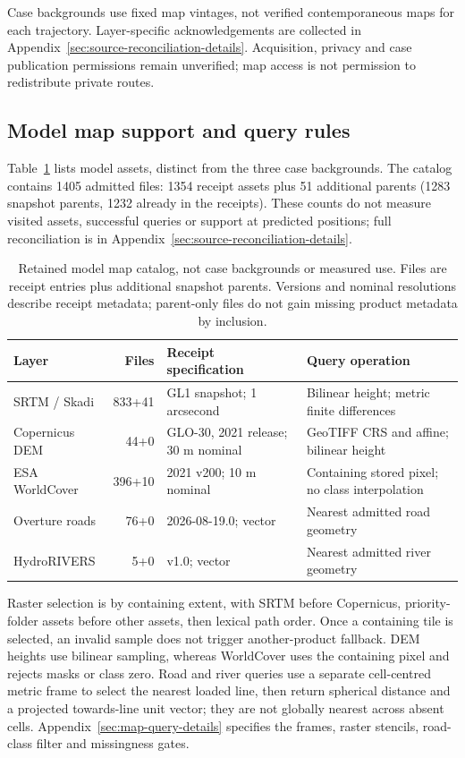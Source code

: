 \documentclass[11pt]{article}
\begin{document}
Case backgrounds use fixed map vintages, not verified contemporaneous
maps for each trajectory. Layer-specific acknowledgements are collected in
Appendix~\ref{sec:source-reconciliation-details}. Acquisition, privacy and
case publication permissions remain unverified; map access is not permission
to redistribute private routes.

\subsection{Model map support and query rules}
\label{sec:model-map-support}
Table~\ref{tab:model-map-catalog} lists model assets, distinct from the three
case backgrounds. The catalog contains 1405 admitted files: 1354 receipt
assets plus 51 additional parents (1283 snapshot parents, 1232 already in the
receipts). These counts do not measure visited assets, successful queries or
support at predicted positions; full reconciliation is in
Appendix~\ref{sec:source-reconciliation-details}.

\begin{table}[htbp]
\centering\footnotesize
\caption{Retained model map catalog, not case backgrounds or measured use.
Files are receipt entries plus additional snapshot parents. Versions and
nominal resolutions describe receipt metadata; parent-only files do not gain
missing product metadata by inclusion.}
\label{tab:model-map-catalog}
\begin{tabular}{@{}p{.24\linewidth}rp{.23\linewidth}p{.32\linewidth}@{}}
\toprule
Layer & Files & Receipt specification & Query operation\\
\midrule
SRTM / Skadi & 833+41 & GL1 snapshot; 1 arcsecond & Bilinear height; metric finite differences\\
Copernicus DEM & 44+0 & GLO-30, 2021 release; 30 m nominal & GeoTIFF CRS and affine; bilinear height\\
ESA WorldCover & 396+10 & 2021 v200; 10 m nominal & Containing stored pixel; no class interpolation\\
Overture roads & 76+0 & 2026-08-19.0; vector & Nearest admitted road geometry\\
HydroRIVERS & 5+0 & v1.0; vector & Nearest admitted river geometry\\
\bottomrule
\end{tabular}
\end{table}

Raster selection is by containing extent, with SRTM before Copernicus,
priority-folder assets before other assets, then lexical path order.
Once a containing tile is selected, an invalid sample does not trigger
another-product fallback. DEM heights use bilinear sampling, whereas
WorldCover uses the containing pixel and rejects masks or class zero.
Road and river queries use a separate cell-centred metric frame to select
the nearest loaded line, then return spherical distance and a projected
towards-line unit vector; they are not globally nearest across absent cells.
Appendix~\ref{sec:map-query-details} specifies the frames, raster stencils,
road-class filter and missingness gates.
\end{document}

